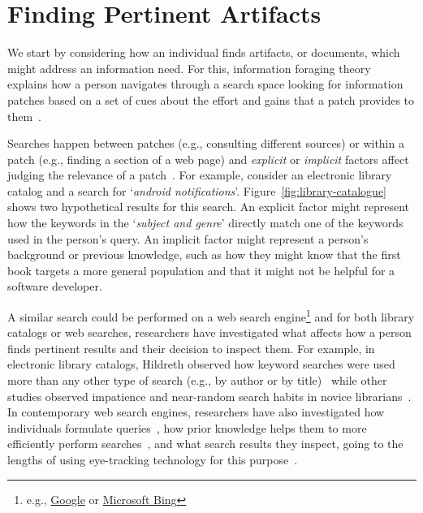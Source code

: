 


\section{Finding Pertinent Artifacts}
\label{cp2:searching}


We start by considering how an individual finds 
artifacts, or documents, which might 
address an information need. 
For this, information foraging theory~\cite{Pirolli1999} explains how a person navigates through  
a search space looking for information patches  based on 
a set of cues about the effort and gains that a patch provides to them~\cite{Pirolli1999}.



Searches happen between patches (e.g., consulting different sources) or within a patch (e.g., finding a section of a web page) 
and \textit{explicit} or \textit{implicit} factors affect judging the relevance of a patch~\cite{saracevic1975}.
For example,
consider an electronic library catalog and a search for `\textit{android notifications}'.
Figure~\ref{fig:library-catalogue} shows two hypothetical results for this search. %
An explicit factor might represent how the keywords in the `\textit{subject and genre}' 
directly match one of the keywords used in the person's query. An implicit factor might represent 
a person's background or previous knowledge, such as how 
they might know that the first book targets a more general population and 
that it might not be helpful for a software developer.








A similar search could be performed on a web search engine\footnote{e.g., \href{https://www.google.com/}{Google} or \href{https://www.bing.com/}{Microsoft Bing}}
and for both library catalogs or web searches, researchers have investigated 
what affects how a person finds pertinent results and their decision to inspect them.
For example, in electronic library catalogs,
Hildreth observed how keyword searches were used more than any other type of search (e.g., by author or by title)~\cite{hildreth1997}
while other studies observed impatience and near-random search habits in novice librarians~\cite{novotny2004don}.
In contemporary web search engines, researchers have  also 
investigated how individuals formulate queries~\cite{gross2005have, bendersky2012},
how prior knowledge helps them
to more efficiently perform searches~\cite{DeGraaf2014},
and what search results they inspect, going to the lengths
of using eye-tracking technology for this purpose~\cite{Cutrell2007, marcos2015}.



